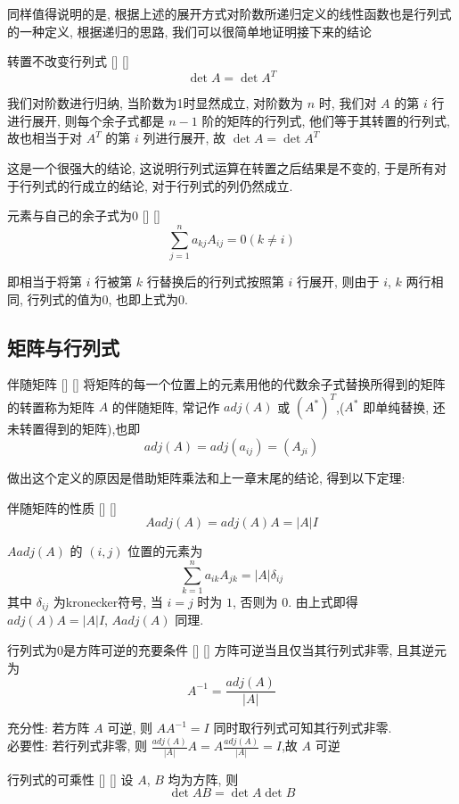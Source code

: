 \documentclass[UTF8]{ctexart}
\DeclareMathOperator{\0}{\mathbf{0}}
\DeclareMathOperator{\<}{\langle}
\renewcommand{\>}{\rangle}
\begin{document}
        同样值得说明的是, 根据上述的展开方式对阶数所递归定义的线性函数也是行列式的一种定义, 根据递归的思路, 我们可以很简单地证明接下来的结论
    \begin{thm}
			[]
			{转置不改变行列式}
			[]
			[]
        \[\det A=\det A^{T}\]
    \end{thm}
    \begin{prf}
        我们对阶数进行归纳, 当阶数为1时显然成立, 对阶数为 \(n\) 时, 我们对 \(A\) 的第 \(i\) 行进行展开, 则每个余子式都是 \(n-1\) 阶的矩阵的行列式, 他们等于其转置的行列式, 故也相当于对 \(A^{T}\) 的第 \(i\) 列进行展开, 故 \(\det A=\det A^{T}\) 
    \end{prf}
    这是一个很强大的结论, 这说明行列式运算在转置之后结果是不变的, 于是所有对于行列式的行成立的结论, 对于行列式的列仍然成立.
    \begin{thm}
			[]
			{元素与自己的余子式 为0}
			[]
			[]
        \[\sum_{j=1}^na_{kj}A_{ij}=0(k\neq i)\]
    \end{thm}
    \begin{prf}
        即相当于将第 \(i\) 行被第 \(k\) 行替换后的行列式按照第 \(i\) 行展开, 则由于 \(i\),  \(k\) 两行相同, 行列式的值为0, 也即上式为0.
    \end{prf}

    \subsection{矩阵与行列式}

    \begin{dfn}
			[]
			{伴随矩阵}
			[]
			[]
        将矩阵的每一个位置上的元素用他的代数余子式替换所得到的矩阵的转置称为矩阵 \(A\) 的伴随矩阵, 常记作 \(adj(A)\) 或 \((A^{*})^{T}\),(\(A^{*}\) 即单纯替换, 还未转置得到的矩阵),也即\[
        adj(A)=adj(a_{ij})=(A_{ji})
        \]
    \end{dfn}
    做出这个定义的原因是借助矩阵乘法和上一章末尾的结论, 得到以下定理: 
    \begin{thm}
			[]
			{伴随矩阵的性质}
			[]
			[]
        \[A adj(A)=adj(A)A=|A|I\]
    \end{thm}
    \begin{prf}
     \(Aadj(A)\) 的 \((i,j)\) 位置的元素为\[
    \sum_{k=1}^{n}a_{ik}A_{jk}=|A|\delta_{ij}
    \]
    其中 \(\delta_{ij}\) 为kronecker符号, 当 \(i=j\) 时为 \(1\), 否则为 \(0\). 由上式即得 \(adj(A)A=|A|I\),  \(Aadj(A)\) 同理.
    \end{prf}
    \begin{thm}
			[]
			{行列式为0是方阵可逆的充要条件}
			[]
			[]
        方阵可逆当且仅当其行列式非零, 且其逆元为\[
        A^{-1}=\frac{adj(A)}{|A|}
        \]
    \end{thm}
    \begin{prf}
        充分性: 若方阵 \(A\) 可逆, 则 \(AA^{-1}=I\) 同时取行列式可知其行列式非零.\\
        必要性: 若行列式非零, 则 \(\frac{adj(A)}{|A|}A=A\frac{adj(A)}{|A|}=I\),故 \(A\) 可逆
        
    \end{prf}
    \begin{thm}
			[]
			{行列式的可乘性}
			[]
			[]
        设 \(A\), \(B\) 均为方阵, 则
        \[\det AB=\det A\det B\]
    \end{thm}
\end{document}
